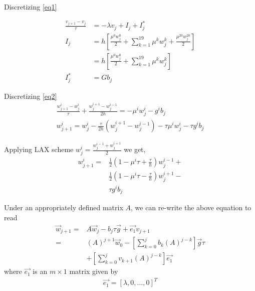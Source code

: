 \documentclass{ifacconf}
\begin{document}
Discretizing \eqref{eq1}

\begin{align} \label{eq:disceq1}
\frac{v_{j+1}-v_j}{\tau} &= -\lambda v_j + I_j + I_j^{*} \\
I_j &= h[\frac{\mu^0 w_j^0}{2} + \sum_{k=1}^{19} \mu^k w_j^k + \frac{\mu^{20} w_j^{20}}{2} ] \\
    &=  h[\frac{\mu^0 w_j^0}{2} + \sum_{k=1}^{19} \mu^k w_j^k ] \nonumber \\
I_j^{*} &= Gb_j
\end{align}


Discretizing \eqref{eq2}
\begin{align} \label{eq:disceq2}
\frac{w_{j+1}^i-w_{j}^i}{\tau} + \frac{w_j^{i+1}-w_j^{i-1}}{2h} = -\mu^iw_j^i - g^ib_j \nonumber\\
w_{j+1}^i=w_{j}^i-\frac{\tau}{2h}(w_j^{i+1}-w_j^{i-1})-\tau\mu^i w_j^i - \tau g^i b_j
\end{align}

Applying LAX scheme $w_j^i = \frac{w_j^{i-1} + w_j^{i+1}}{2}$ we get,
\begin{align*}
	w^i_{j+1} =& \frac{1}{2}\left( 1-\mu^i\tau + \frac{\tau}{h} \right) w^{i-1}_j + \\
	           & \frac{1}{2}\left( 1-\mu^i\tau - \frac{\tau}{h} \right) w^{i+1}_j - \\
		   & \tau g^i b_j
\end{align*}

Under an appropriately defined matrix $A$, we can re-write the above equation to read
\begin{align}
	\vec{w}_{j+1} =& A\vec{w}_j - b_j\tau\vec{g} + \vec{e_1}v_{j+1} \\
	=& (A)^{j+1} \vec{w}_0 - \left[ \sum_{k=0}^j b_k (A)^{j-k} \right]\vec{g}\tau \\
	&+ \left[ \sum_{k=0}^j v_{k+1}(A)^{j-k} \right]\vec{e_1} \nonumber
\end{align}
where $\vec{e_1}$ is an $m\times1$ matrix given by
\begin{align}
	\vec{e_1} = \left[ \lambda,0,\dots,0 \right]^T
\end{align}
\end{document}
